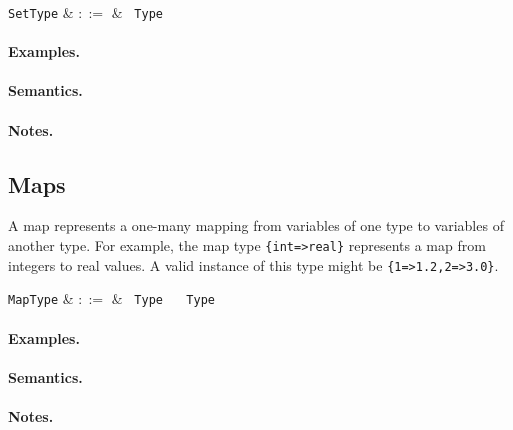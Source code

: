 \begin{syntax}
  \verb+SetType+ & $::=$ & \token{\{} \ \verb+Type+ \ \token{\}} \\
\end{syntax}

\paragraph{Examples.}

\paragraph{Semantics.}

\paragraph{Notes.} 


\subsection{Maps}
\label{c_types_map}

A map represents a one-many mapping from variables of one type to variables of another type. For example, the map type \lstinline|{int=>real}| represents a map from integers to real values. A valid instance of this type might be \lstinline|{1=>1.2,2=>3.0}|.

\begin{syntax}
  \verb+MapType+ & $::=$ & \token{\{} \ \verb+Type+ \ \token{=>} \ \verb+Type+ \ \token{\}} \\
\end{syntax}

\paragraph{Examples.}

\paragraph{Semantics.}

\paragraph{Notes.} 

